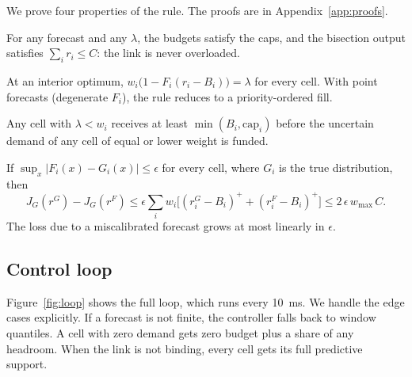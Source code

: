 We prove four properties of the rule. The proofs are in Appendix~\ref{app:proofs}.

\begin{proposition}[Feasibility]\label{prop:feas}
For any forecast and any $\lambda$, the budgets satisfy the caps, and the bisection output satisfies $\sum_i r_i \le C$: the link is never overloaded.
\end{proposition}

\begin{proposition}\label{prop:equal}
At an interior optimum, $w_i\big(1 - F_i(r_i - B_i)\big) = \lambda$ for every cell. With point forecasts (degenerate $F_i$), the rule reduces to a priority-ordered fill.
\end{proposition}

\begin{proposition}\label{prop:backlog}
Any cell with $\lambda < w_i$ receives at least $\min(B_i,\mathrm{cap}_i)$ before the uncertain demand of any cell of equal or lower weight is funded.
\end{proposition}

\begin{proposition}\label{prop:robust}
If $\sup_x |F_i(x) - G_i(x)| \le \epsilon$ for every cell, where $G_i$ is the true distribution, then
\begin{equation}
  J_G(r^G) - J_G(r^F) \le \epsilon\sum_i w_i\big[(r_i^G - B_i)^+ + (r_i^F - B_i)^+\big] \le 2\,\epsilon\, w_{\max}\, C .
\end{equation}
The loss due to a miscalibrated forecast grows at most linearly in $\epsilon$.
\end{proposition}

\subsection{Control loop}

Figure~\ref{fig:loop} shows the full loop, which runs every 10~ms. We handle the edge cases explicitly. If a forecast is not finite, the controller falls back to window quantiles. A cell with zero demand gets zero budget plus a share of any headroom. When the link is not binding, every cell gets its full predictive support.

